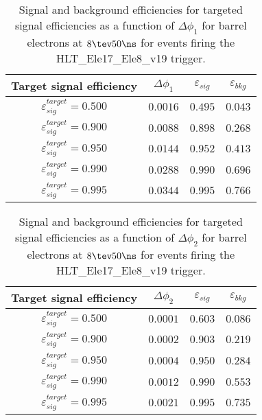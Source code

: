 \begin{table}[!bht]
  \begin{center}
    \begin{tabular}{cccc}
      \hline
      Target signal efficiency & $\Delta\phi_1$ & $\varepsilon_{sig}$ & $\varepsilon_{bkg}$ \\ 
      \hline
      $\varepsilon_{sig}^{target} = 0.500$ & $  0.0016$ & $0.495$ & $0.043$ \\
      $\varepsilon_{sig}^{target} = 0.900$ & $  0.0088$ & $0.898$ & $0.268$ \\
      $\varepsilon_{sig}^{target} = 0.950$ & $  0.0144$ & $0.952$ & $0.413$ \\
      $\varepsilon_{sig}^{target} = 0.990$ & $  0.0288$ & $0.990$ & $0.696$ \\
      $\varepsilon_{sig}^{target} = 0.995$ & $  0.0344$ & $0.995$ & $0.766$ \\
      \hline
    \end{tabular}
    \caption{Signal and background efficiencies for targeted signal efficiencies as a function of $\Delta\phi_1$ for barrel electrons at $8\tev 50\ns$ for events firing the HLT\_Ele17\_Ele8\_v19 trigger.}
    \label{tab:eff_rej_phi1_beam_8_50_trigger_17_8_B}
  \end{center}
\end{table}

\clearpage

\begin{table}[!bht]
  \begin{center}
    \begin{tabular}{cccc}
      \hline
      Target signal efficiency & $\Delta\phi_2$ & $\varepsilon_{sig}$ & $\varepsilon_{bkg}$ \\ 
      \hline
      $\varepsilon_{sig}^{target} = 0.500$ & $  0.0001$ & $0.603$ & $0.086$ \\
      $\varepsilon_{sig}^{target} = 0.900$ & $  0.0002$ & $0.903$ & $0.219$ \\
      $\varepsilon_{sig}^{target} = 0.950$ & $  0.0004$ & $0.950$ & $0.284$ \\
      $\varepsilon_{sig}^{target} = 0.990$ & $  0.0012$ & $0.990$ & $0.553$ \\
      $\varepsilon_{sig}^{target} = 0.995$ & $  0.0021$ & $0.995$ & $0.735$ \\
      \hline
    \end{tabular}
    \caption{Signal and background efficiencies for targeted signal efficiencies as a function of $\Delta\phi_2$ for barrel electrons at $8\tev 50\ns$ for events firing the HLT\_Ele17\_Ele8\_v19 trigger.}
    \label{tab:eff_rej_phi2_beam_8_50_trigger_17_8_B}
  \end{center}
\end{table}

